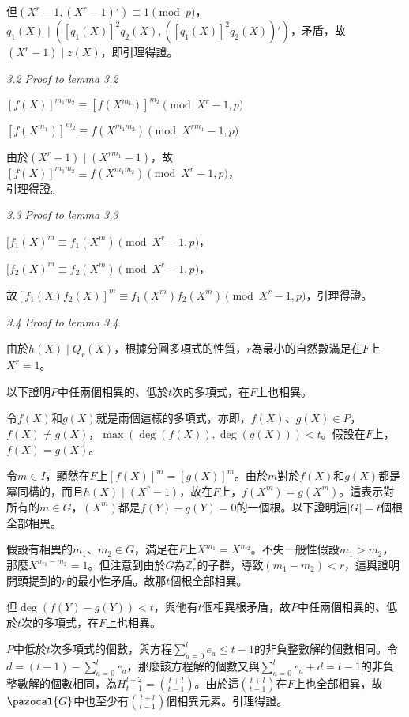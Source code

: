 \documentclass{article}
\newcommand{\Gc}{\pazocal{G}}
\begin{document}
        但$(X^r-1,(X^r-1)')\equiv 1\pmod{p}$，$q_1(X)\mid([q_1(X)]^2q_2(X), ([q_1(X)]^2q_2(X))')$，矛盾，故$(X^r-1)\mid z(X)$，即引理得證。

 \vspace{12pt} 

\noindent\textit{3.2 Proof to lemma 3.2}

    $[f(X)]^{m_1m_2}\equiv [f(X^{m_1})]^{m_2}\pmod{X^r-1,p}$

    $[f(X^{m_1})]^{m_2}\equiv f(X^{m_1m_2})\pmod{X^{rm_1}-1,p}$

    由於$(X^r-1)\mid(X^{rm_1}-1)$，故\\
    $[f(X)]^{m_1m_2}\equiv f(X^{m_1m_2})\pmod{X^r-1,p}$，\\
    引理得證。

 \vspace{12pt} 

\noindent\textit{3.3 Proof to lemma 3.3}

    $[f_1(X)^m\equiv f_1(X^m)\pmod{X^r-1,p}$，

    $[f_2(X)^m\equiv f_2(X^m)\pmod{X^r-1,p}$，
    
    故$[f_1(X)f_2(X)]^m\equiv f_1(X^m)f_2(X^m)\pmod{X^r-1,p}$，引理得證。

 \vspace{12pt} 

\noindent\textit{3.4 Proof to lemma 3.4}

    由於$h(X)\mid Q_r(X)$，根據分圓多項式的性質，$r$為最小的自然數滿足在$F$上$X^r=1$。

    以下證明$P$中任兩個相異的、低於$t$次的多項式，在$F$上也相異。

    令$f(X)$和$g(X)$就是兩個這樣的多項式，亦即，$f(X)$、$g(X)\in P$，$f(X)\neq g(X)$，$\max(\deg(f(X)),\deg(g(X)))<t$。假設在$F$上，$f(X)=g(X)$。

    令$m\in I$，顯然在$F$上$[f(X)]^m=[g(X)]^m$。由於$m$對於$f(X)$和$g(X)$都是冪同構的，而且$h(X)\mid (X^r-1)$，故在$F$上，$f(X^m)=g(X^m)$。這表示對所有的$m\in G$，$(X^m)$都是$f(Y)-g(Y)=0$的一個根。以下證明這$|G|=t$個根全部相異。
    
    假設有相異的$m_1$、$m_2\in G$，滿足在$F$上$X^{m_1}=X^{m_2}$。不失一般性假設$m_1>m_2$，那麼$X^{m_1-m_2}=1$。但注意到由於$G$為$\mathbb{Z}_r^*$的子群，導致$(m_1-m_2)<r$，這與證明開頭提到的$r$的最小性矛盾。故那$t$個根全部相異。

    但$\deg(f(Y)-g(Y))<t$，與他有$t$個相異根矛盾，故$P$中任兩個相異的、低於$t$次的多項式，在$F$上也相異。

    $P$中低於$t$次多項式的個數，與方程$\sum\limits_{a=0}^{l}e_a\leq t-1$的非負整數解的個數相同。令$d=(t-1)-\sum\limits_{a=0}^{l}e_a$，那麼該方程解的個數又與$\sum\limits_{a=0}^{l}e_a+d=t-1$的非負整數解的個數相同，為$H_{t-1}^{l+2}=\binom{t+l}{t-1}$。由於這$\binom{t+l}{t-1}$在$F$上也全部相異，故$\Gc$中也至少有$\binom{t+l}{t-1}$個相異元素。引理得證。
\end{document}

